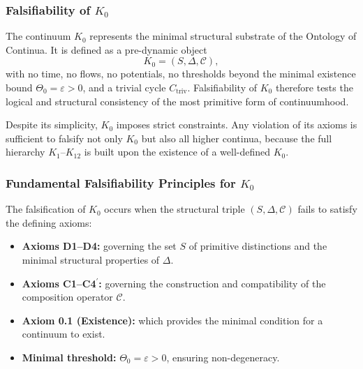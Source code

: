 
\subsubsection{Falsifiability of \texorpdfstring{$K_0$}{K_0}}
\label{sec:falsifiability-k0}

The continuum $K_0$ represents the minimal structural substrate of the
Ontology of Continua.
It is defined as a pre-dynamic object
\[
K_0 = (S,\Delta,\mathcal{C}),
\]
with no time, no flows, no potentials, no thresholds beyond the minimal
existence bound $\Theta_0=\varepsilon>0$, and a trivial cycle
$C_{\mathrm{triv}}$.
Falsifiability of $K_0$ therefore tests the logical and structural
consistency of the most primitive form of continuumhood.

Despite its simplicity, $K_0$ imposes strict constraints.
Any violation of its axioms is sufficient to falsify not only $K_0$
but also all higher continua, because the full hierarchy
$K_1$–$K_{12}$ is built upon the existence of a well-defined $K_0$.



\subsubsection{Fundamental Falsifiability Principles for \texorpdfstring{$K_0$}{K_0}}

The falsification of $K_0$ occurs when the structural triple 
$(S,\Delta,\mathcal{C})$ fails to satisfy the defining axioms:

\begin{itemize}
    \item \textbf{Axioms D1–D4:}  
          governing the set $S$ of primitive distinctions and the
          minimal structural properties of $\Delta$.

    \item \textbf{Axioms C1–C4$^\prime$:}  
          governing the construction and compatibility of the
          composition operator $\mathcal{C}$.

    \item \textbf{Axiom 0.1 (Existence):}  
          which provides the minimal condition for a continuum to exist.

    \item \textbf{Minimal threshold:}  
          $\Theta_0 = \varepsilon > 0$, ensuring non-degeneracy.
\end{itemize}

